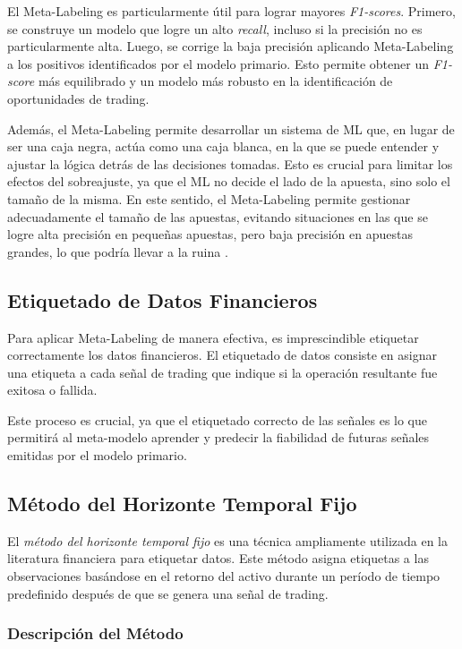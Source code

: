 \documentclass[a4paper,12pt, twoside]{report}
\begin{document}
El Meta-Labeling es particularmente útil para lograr mayores \textit{F1-scores}. 
Primero, se construye un modelo que logre un alto \textit{recall}, incluso si la 
precisión no es particularmente alta. Luego, se corrige la baja precisión aplicando 
Meta-Labeling a los positivos identificados por el modelo primario. Esto permite 
obtener un \textit{F1-score} más equilibrado y un modelo más robusto en la 
identificación de oportunidades de trading.

Además, el Meta-Labeling permite desarrollar un sistema de ML que, en lugar de 
ser una caja negra, actúa como una caja blanca, en la que se puede entender y 
ajustar la lógica detrás de las decisiones tomadas. Esto es crucial para limitar 
los efectos del sobreajuste, ya que el ML no decide el lado de la apuesta, sino 
solo el tamaño de la misma. En este sentido, el Meta-Labeling permite gestionar 
adecuadamente el tamaño de las apuestas, evitando situaciones en las que se 
logre alta precisión en pequeñas apuestas, pero baja precisión en apuestas 
grandes, lo que podría llevar a la ruina \cite{lopezdeprado2018afml}.

\subsection{Etiquetado de Datos Financieros}

Para aplicar Meta-Labeling de manera efectiva, es imprescindible etiquetar correctamente 
los datos financieros. El etiquetado de datos consiste en asignar una etiqueta a cada 
señal de trading que indique si la operación resultante fue exitosa o fallida. 

Este proceso es crucial, ya que el etiquetado correcto de las señales es lo que 
permitirá al meta-modelo aprender y predecir la fiabilidad de futuras señales 
emitidas por el modelo primario.

\subsection{Método del Horizonte Temporal Fijo}

El \textit{método del horizonte temporal fijo} es una técnica ampliamente utilizada en la literatura financiera para etiquetar datos. Este método asigna etiquetas a las observaciones basándose en el retorno del activo durante un período de tiempo predefinido después de que se genera una señal de trading.

\subsubsection{Descripción del Método}
\end{document}
